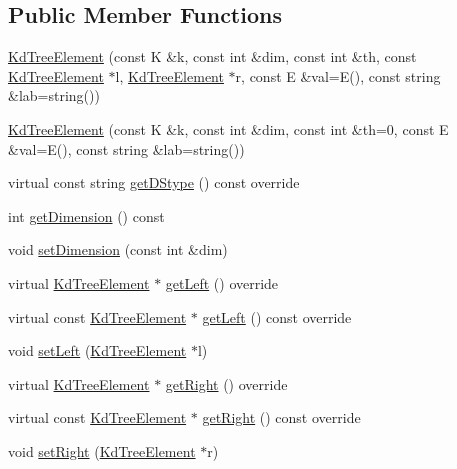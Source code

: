 \subsection*{Public Member Functions}
\begin{DoxyCompactItemize}
\item 
\mbox{\hyperlink{classbridges_1_1_kd_tree_element_a0a50d048eb39497beed77ed4b0566876}{Kd\+Tree\+Element}} (const K \&k, const int \&dim, const int \&th, const \mbox{\hyperlink{classbridges_1_1_kd_tree_element}{Kd\+Tree\+Element}} $\ast$l, \mbox{\hyperlink{classbridges_1_1_kd_tree_element}{Kd\+Tree\+Element}} $\ast$r, const E \&val=E(), const string \&lab=string())
\item 
\mbox{\hyperlink{classbridges_1_1_kd_tree_element_a50774bfe7e28ddb78bc0da8acec70eb2}{Kd\+Tree\+Element}} (const K \&k, const int \&dim, const int \&th=0, const E \&val=E(), const string \&lab=string())
\item 
virtual const string \mbox{\hyperlink{classbridges_1_1_kd_tree_element_acdd8f989986b7dd42cfacec73cf52dcb}{get\+D\+Stype}} () const override
\item 
int \mbox{\hyperlink{classbridges_1_1_kd_tree_element_aa7b34640fafac747b2e1185572e3dcc8}{get\+Dimension}} () const
\item 
void \mbox{\hyperlink{classbridges_1_1_kd_tree_element_a8c2c8503d8c8aa0db31fa834dffb60b0}{set\+Dimension}} (const int \&dim)
\item 
virtual \mbox{\hyperlink{classbridges_1_1_kd_tree_element}{Kd\+Tree\+Element}} $\ast$ \mbox{\hyperlink{classbridges_1_1_kd_tree_element_ad7db63a4f82f5252c7e0809ac6486cb4}{get\+Left}} () override
\item 
virtual const \mbox{\hyperlink{classbridges_1_1_kd_tree_element}{Kd\+Tree\+Element}} $\ast$ \mbox{\hyperlink{classbridges_1_1_kd_tree_element_ab58af4ca67cb3869c279bfc11952c070}{get\+Left}} () const override
\item 
void \mbox{\hyperlink{classbridges_1_1_kd_tree_element_a4aabf3ae1f9e77676f5c7b87181ada67}{set\+Left}} (\mbox{\hyperlink{classbridges_1_1_kd_tree_element}{Kd\+Tree\+Element}} $\ast$l)
\item 
virtual \mbox{\hyperlink{classbridges_1_1_kd_tree_element}{Kd\+Tree\+Element}} $\ast$ \mbox{\hyperlink{classbridges_1_1_kd_tree_element_a8e1090891a720231c2009d1d222471e9}{get\+Right}} () override
\item 
virtual const \mbox{\hyperlink{classbridges_1_1_kd_tree_element}{Kd\+Tree\+Element}} $\ast$ \mbox{\hyperlink{classbridges_1_1_kd_tree_element_a48e6a81eccf6d156e50865ef8066be82}{get\+Right}} () const override
\item 
void \mbox{\hyperlink{classbridges_1_1_kd_tree_element_a119124cbfcc0e792ea60cb56c0a63119}{set\+Right}} (\mbox{\hyperlink{classbridges_1_1_kd_tree_element}{Kd\+Tree\+Element}} $\ast$r)
\end{DoxyCompactItemize}
